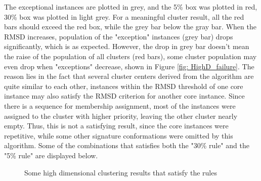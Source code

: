 \documentclass[a4paper]{article}
\begin{document}
The exceptional instances are plotted in grey, and the 5\% box was plotted in red, 30\% box was plotted in light grey. For a meaningful cluster result, all the red bars should exceed the red box, while the grey bar below the gray bar. When the RMSD increases, population of the "exception" instances (grey bar) drops significantly, which is as expected. However, the drop in grey bar doesn't mean the raise of the population of all clusters (red bars), some cluster population may even drop when "exceptions" decrease, shown in Figure \ref{fig: HighD_failure}. The reason lies in the fact that several cluster centers derived from the algorithm are quite similar to each other, instances within the RMSD threshold of one core instance may also satisfy the RMSD criterion for another core instance. Since there is a sequence for membership assignment, most of the instances were assigned to the cluster with higher priority, leaving the other cluster nearly empty. Thus, this is not a satisfying result, since the core instances were repetitive, while some other signature conformations were omitted by this algorithm. Some of the combinations that satisfies both the "30\% rule" and the "5\% rule" are displayed below.

\begin{figure}[H]
    \centering
    \caption{Some high dimensional clustering results that satisfy the rules}
    \label{fig: highD_success}
\end{figure}
\end{document}
